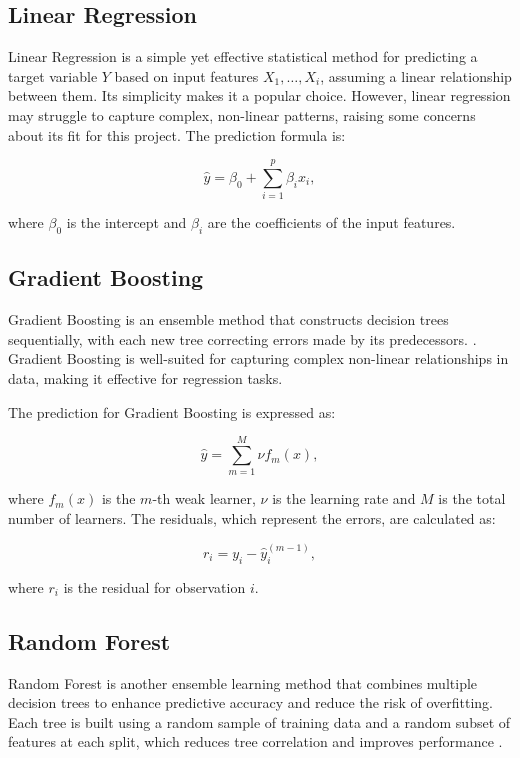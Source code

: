 \subsection{Linear Regression}

Linear Regression is a simple yet effective statistical method for predicting a target variable \( Y \) based on input features \( X_1, \ldots, X_i \), assuming a linear relationship between them. Its simplicity makes it a popular choice. However, linear regression may struggle to capture complex, non-linear patterns, raising some concerns about its fit for this project. The prediction formula is:

\begin{equation}
    \hat{y} = \beta_0 + \sum_{i=1}^{p} \beta_i x_i,
\end{equation}

where \( \beta_0 \) is the intercept and \( \beta_i \) are the coefficients of the input features.


\subsection{Gradient Boosting}

Gradient Boosting is an ensemble method that constructs decision trees sequentially, with each new tree correcting errors made by its predecessors. \cite{BentejacCandice2021Acao}. Gradient Boosting is well-suited for capturing complex non-linear relationships in data, making it effective for regression tasks.

The prediction for Gradient Boosting is expressed as:

\begin{equation}
    \hat{y} = \sum_{m=1}^{M} \nu f_m(x),
\end{equation}

where \( f_m(x) \) is the \( m \)-th weak learner, \( \nu \) is the learning rate and \( M \) is the total number of learners. The residuals, which represent the errors, are calculated as:

\begin{equation}
    r_i = y_i - \hat{y}_i^{(m-1)},
\end{equation}

where \( r_i \) is the residual for observation \( i \).

\subsection{Random Forest}
Random Forest is another ensemble learning method that combines multiple decision trees to enhance predictive accuracy and reduce the risk of overfitting. Each tree is built using a random sample of training data and a random subset of features at each split, which reduces tree correlation and improves performance \cite{BentejacCandice2021Acao}.

